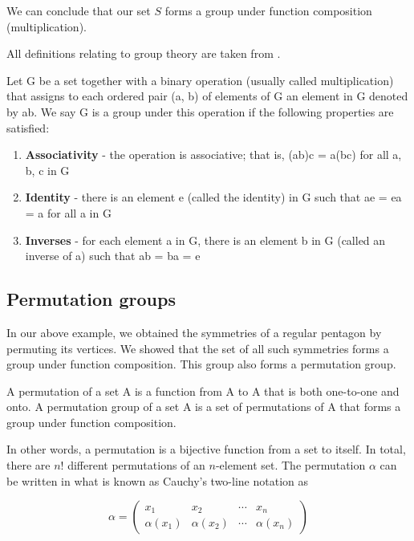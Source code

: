We can conclude that our set $S$ forms a group under function composition (multiplication).

All definitions relating to group theory are taken from \cite{gal12}.

\begin{definition}
\label{def:group}
Let G be a set together with a binary operation (usually called multiplication) that assigns to each ordered pair (a, b) of elements of G an element in G denoted by ab. We say G is a group under this operation if the following properties are satisfied:
\begin{enumerate}
\item \textbf{Associativity} - the operation is associative; that is, (ab)c = a(bc) for all a, b, c in G
\item \textbf{Identity} - there is an element e (called the identity) in G such that ae = ea = a for all a in G
\item \textbf{Inverses} - for each element a in G, there is an element b in G (called an inverse of a) such that ab = ba = e
\end{enumerate}
\end{definition}

\subsection{Permutation groups}

In our above example, we obtained the symmetries of a regular pentagon by permuting its vertices. We showed that the set of all such symmetries forms a group under function composition. This group also forms a permutation group.

\begin{definition}
\label{def:perm}
A permutation of a set A is a function from A to A that is both one-to-one and onto. A permutation group of a set A is a set of permutations of A that forms a group under function composition.
\end{definition}

In other words, a permutation is a bijective function from a set to itself. In total, there are $n!$ different permutations of an $n$-element set. The permutation $\alpha$ can be written in what is known as Cauchy's two-line notation as

\begin{equation}
\alpha =
\begin{pmatrix}
x_1 & x_2 & \cdots & x_n \\
\alpha(x_1) & \alpha(x_2) & \cdots & \alpha(x_n)
\end{pmatrix}
\end{equation}

